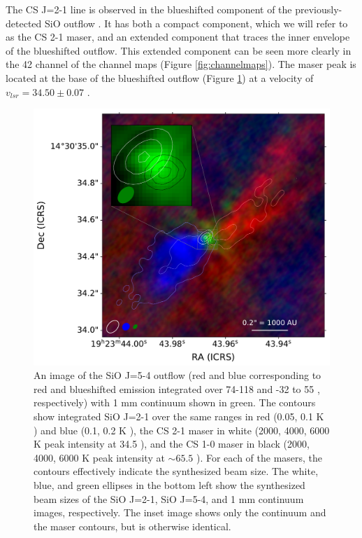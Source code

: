\documentclass[twocolumn]{aastex62}
\begin{document}
The CS J=2-1 line is observed in the blueshifted component of the
previously-detected SiO outflow \citep{Goddi2018a}.
It has both a compact component, which we will refer to as the CS 2-1 maser,
and an extended component that traces the inner envelope of the blueshifted
outflow.  This extended component can be seen more clearly in the 42 \kms
channel of the channel maps (Figure \ref{fig:channelmaps}).  The maser
peak is located at the base of the blueshifted outflow (Figure
\ref{fig:overlay}) at a velocity of $v_{lsr}=34.50\pm0.07$ \kms.

\begin{figure}[htp]
    \includegraphics[width=\textwidth]{figures/W51e2e_sio_outflow_with_CS_contours.pdf}
    \caption{An image of the SiO J=5-4 outflow (red and blue corresponding to
    red and blueshifted emission integrated over 74-118 \kms and -32 to 55
    \kms, respectively) with 1 mm continuum shown in green.  The contours show
    integrated SiO J=2-1 over the same ranges in red (0.05, 0.1 K \kms) and
    blue (0.1, 0.2 K \kms), the CS 2-1
    maser in white (2000, 4000, 6000 K peak intensity at 34.5 \kms),
    and the CS 1-0 maser in black (2000, 4000, 6000 K peak intensity at
    $\sim65.5$ \kms).  For each of the masers, the contours effectively
    indicate the synthesized beam size.  The white, blue, and green
    ellipses in the bottom left show the synthesized beam sizes of the SiO
    J=2-1, SiO J=5-4, and 1 mm continuum images, respectively.
    The inset image shows only the continuum and the maser contours,
    but is otherwise identical.
    }
    \label{fig:overlay}
\end{figure}
\end{document}
